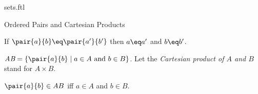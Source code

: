 \documentclass{naproche-library}
\begin{document}
\begin{smodule}[title=Classes and Sets]{sets.ftl}
\begin{sfragment}{Ordered Pairs and Cartesian Products}
  \begin{axiom*}[forthel,title=Pair Extensionality Axiom,id=PairExtensionalityAx]
    If $\pair{a}{b}\eq \pair{a'}{b'}$ then $a\eq a'$ and $b\eq b'$.
  \end{axiom*}

  \begin{definition*}[forthel,id=CartesianProductDef]
    $\emph{A\times B}=\{\pair{a}{b}\mid a\in A\text{ and }b\in B\}$.
    Let the \emph{Cartesian product of $A$ and $B$} stand for $A\times B$.
  \end{definition*}

  \begin{proposition*}[forthel,id=CartesianProductProp]
    $\pair{a}{b}\in A\times B$ iff $a\in A$ and $b\in B$.
  \end{proposition*}
\end{sfragment}
\end{smodule}
\end{document}
